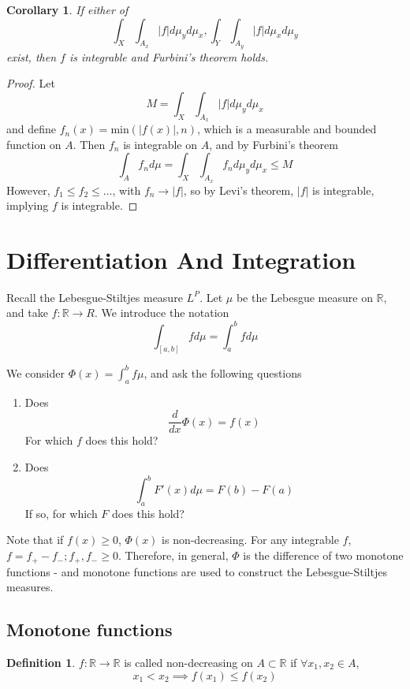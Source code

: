 \documentclass[11pt,a4paper]{report}
\newtheorem{corollary}[theorem]{Corollary}
\theoremstyle{plain}
\theoremstyle{definition}
\newtheorem*{defn}{Definition}
\theoremstyle{remark}
\newcommand{\R}{\mathbb{R}}
\newcommand{\abs}[1]{\left| #1 \right|}
\begin{document}
\begin{corollary}
  If either of
 $$ \int_X \int_{A_x} \abs{f} d\mu_y d\mu_x, \int_Y \int_{A_y} \abs{f} d\mu_x d\mu_y $$
  exist, then $f$ is integrable and Furbini's theorem holds.
\end{corollary}

\begin{proof}
  Let
  $$ M = \int_X \int_{A_x} \abs{f} d\mu_y d\mu_x $$
  and define $f_n(x) = \text{min}(\abs{f(x)}, n)$, which is a measurable and bounded function on $A$. Then $f_n$ is integrable on $A$, and by Furbini's theorem
  $$ \int_A f_n d\mu = \int_X \int_{A_x} f_n d\mu_y d\mu_x \le M $$
  However, $f_1 \le f_2 \le \dots$, with $f_n \rightarrow \abs{f}$, so by Levi's theorem, $\abs{f}$ is integrable, implying $f$ is integrable.
\end{proof}

\section{Differentiation And Integration}

Recall the Lebesgue-Stiltjes measure $L^P$. Let $\mu$ be the Lebesgue measure on $\R$, and take $f : \R \to R$. We introduce the notation
$$ \int_{[a, b]} f d\mu = \int_a^b f d\mu $$

We consider $\Phi(x) = \int_a^b f\mu $, and ask the following questions
\begin{enumerate}
  \item Does $$ \frac{d}{dx}\Phi(x) = f(x) $$
      For which $f$ does this hold?
  \item 
      Does
      $$ \int_a^b F'(x) d\mu = F(b) - F(a) $$
      If so, for which $F$ does this hold?
\end{enumerate}

Note that if $f(x) \ge 0$, $\Phi(x)$ is non-decreasing. For any integrable $f$, $f = f_{+} - f_{-}; f_{+}, f_{-} \ge 0$. Therefore, in general, $\Phi$ is the difference of two monotone functions - and monotone functions are used to construct the Lebesgue-Stiltjes measures.

\subsection{Monotone functions}

\begin{defn}
  $f : \R \to \R$ is called non-decreasing on $A \subset \R$ if $\forall x_1, x_2 \in A$,
    $$ x_1 < x_2 \implies f(x_1) \le f(x_2) $$
\end{defn}
\end{document}
